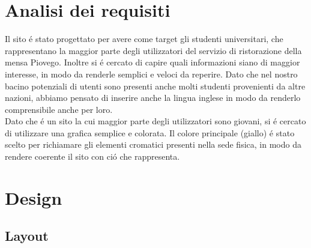 \documentclass[10pt,a4paper,onecolumn]{article}
\begin{document}
\clearpage

\tableofcontents

\clearpage 

\begin{abstract}
Questo progetto consiste nella realizzazione di un sito per la mensa 'RistorESU Nord Piovego'.
Si tratta di un sito che permette di ottenere informazioni utili per tutti gli utilizzatori del servizio di ristorazione della mensa Piovego, come ad esempio la lista dei piatti serviti, le informazioni sulle tariffe o la posizione geografica.
\end{abstract}

\clearpage

\section{Analisi dei requisiti}
Il sito \'e stato progettato per avere come target gli studenti universitari, che rappresentano la maggior parte degli utilizzatori del servizio di ristorazione della mensa Piovego. Inoltre si \'e cercato di capire quali informazioni siano di maggior interesse, in modo da renderle semplici e veloci da reperire.
Dato che nel nostro bacino potenziali di utenti sono presenti anche molti studenti provenienti da altre nazioni, abbiamo pensato di inserire anche la lingua inglese in modo da renderlo comprensibile anche per loro. \\
Dato che \'e un sito la cui maggior parte degli utilizzatori sono giovani, si \'e cercato di utilizzare una grafica semplice e colorata. Il colore principale (giallo) \'e stato scelto per richiamare gli elementi cromatici presenti nella sede fisica, in modo da rendere coerente il sito con ci\'o che rappresenta.

\section{Design}

\subsection{Layout}
\end{document}

